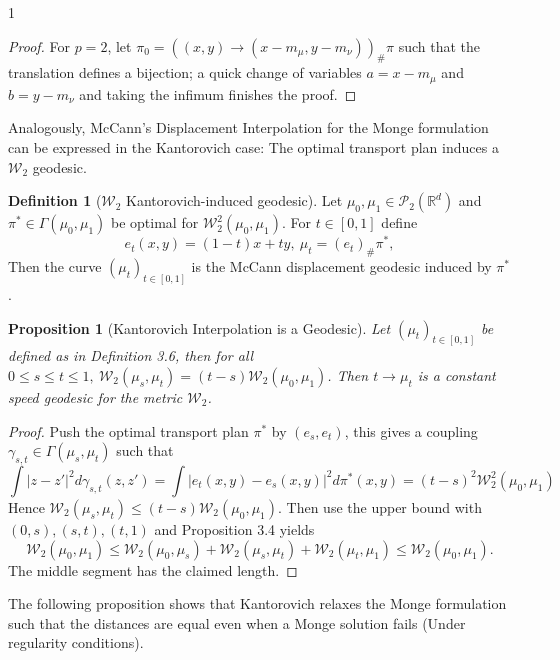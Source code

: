 \documentclass[12pt]{article}
\newtheorem{proposition}[theorem]{Proposition}
\theoremstyle{definition}
\newtheorem{definition}[theorem]{Definition}
\theoremstyle{plain}
\begin{document}
\begin{spacing}{1}
{\begin{proof}
    \bigskip
    For $p = 2$, let $\pi_0= ((x, y) \rightarrow (x - m_\mu, y - m_\nu))_\# \pi$ such that the translation defines a bijection; a quick change of variables $a = x - m_\mu$ and $b = y - m_\nu$ and taking the infimum finishes the proof.
\end{proof}

Analogously, McCann's Displacement Interpolation for the Monge formulation can be expressed in the Kantorovich case: The optimal transport plan induces a $\mathcal{W}_2$ geodesic.

\begin{definition}[$\mathcal{W}_2$ Kantorovich-induced geodesic]
    Let $\mu_0, \mu_1 \in \mathcal{P}_2(\mathbb{R}^d)$ and $\pi^* \in \Gamma(\mu_0, \mu_1)$ be optimal for $\mathcal{W}_2^2(\mu_0, \mu_1)$. For $t \in [0, 1]$ define
    \[
    e_t(x, y) = (1-t)x + ty, \ \mu_t = (e_t)_\# \pi^*,
    \]
    Then the curve $(\mu_t)_{t \in [0, 1]}$ is the McCann displacement geodesic induced by $\pi^*$.
\end{definition}

\newpage
\begin{proposition}[Kantorovich Interpolation is a Geodesic]
    Let $(\mu_t)_{t \in [0, 1]}$ be defined as in Definition 3.6, then for all $0 \leq s \leq t \leq 1, \ \mathcal{W}_2(\mu_s, \mu_t) = (t - s)\mathcal{W}_2(\mu_0, \mu_1)$. Then $t \rightarrow \mu_t$ is a constant speed geodesic for the metric $\mathcal{W}_2$.
\end{proposition}

\begin{proof}
    Push the optimal transport plan $\pi^*$ by $(e_s, e_t)$, this gives a coupling $\gamma_{s, t} \in \Gamma(\mu_s, \mu_t)$ such that
    \[
    \displaystyle \int \lvert z - z' \rvert^2 d\gamma_{s, t}(z, z') = \int \lvert e_t(x, y) - e_s(x, y) \rvert^2 d\pi^*(x, y) = (t - s)^2 \mathcal{W}_2^2(\mu_0, \mu_1)
    \]
    Hence $\mathcal{W}_2(\mu_s, \mu_t) \leq (t - s)\mathcal{W}_2(\mu_0, \mu_1)$. Then use the upper bound with $(0, s), (s, t), (t, 1)$ and Proposition 3.4 yields
    \[
    \mathcal{W}_2(\mu_0, \mu_1) \leq \mathcal{W}_2(\mu_0, \mu_s) + \mathcal{W}_2(\mu_s, \mu_t) + \mathcal{W}_2(\mu_t, \mu_1) \leq \mathcal{W}_2(\mu_0, \mu_1).
    \]
    The middle segment has the claimed length.
\end{proof}

The following proposition shows that Kantorovich relaxes the Monge formulation such that the distances are equal even when a Monge solution fails (Under regularity conditions).

}
\end{spacing}
\end{document}
